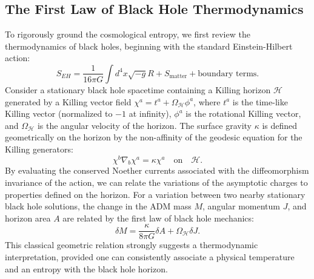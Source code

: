 \subsection{The First Law of Black Hole Thermodynamics}
To rigorously ground the cosmological entropy, we first review the thermodynamics of black holes, beginning with the standard Einstein-Hilbert action:
\begin{equation}
S_{EH} = \frac{1}{16\pi G} \int d^4x \sqrt{-g} R + S_{\text{matter}} + \text{boundary terms}.
\end{equation}
Consider a stationary black hole spacetime containing a Killing horizon $\mathcal{H}$ generated by a Killing vector field $\chi^a = t^a + \Omega_\mathcal{H} \phi^a$, where $t^a$ is the time-like Killing vector (normalized to $-1$ at infinity), $\phi^a$ is the rotational Killing vector, and $\Omega_\mathcal{H}$ is the angular velocity of the horizon. The surface gravity $\kappa$ is defined geometrically on the horizon by the non-affinity of the geodesic equation for the Killing generators:
\begin{equation}
\chi^b \nabla_b \chi^a = \kappa \chi^a \quad \text{on} \quad \mathcal{H}.
\end{equation}
By evaluating the conserved Noether currents associated with the diffeomorphism invariance of the action, we can relate the variations of the asymptotic charges to properties defined on the horizon. For a variation between two nearby stationary black hole solutions, the change in the ADM mass $M$, angular momentum $J$, and horizon area $A$ are related by the first law of black hole mechanics:
\begin{equation}
\delta M = \frac{\kappa}{8\pi G} \delta A + \Omega_\mathcal{H} \delta J.
\end{equation}
This classical geometric relation strongly suggests a thermodynamic interpretation, provided one can consistently associate a physical temperature and an entropy with the black hole horizon.

